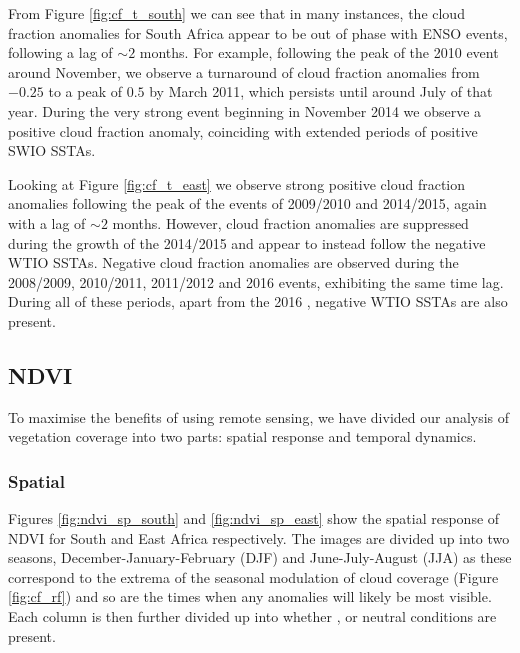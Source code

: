 From Figure \ref{fig:cf_t_south} we can see that in many instances, the
cloud fraction anomalies for South Africa appear to be out of phase
with ENSO events, following a lag of $\sim2$ months. For example,
following the peak of the 2010 \nina{} event around November, we
observe a turnaround of cloud fraction anomalies from $-0.25$ to a
peak of $0.5$ by March 2011, which persists until around July of that
year. During the very strong \elnino{} event beginning in November
2014 we observe a positive cloud fraction anomaly, coinciding with
extended periods of positive SWIO SSTAs.

Looking at Figure \ref{fig:cf_t_east} we observe strong positive cloud
fraction anomalies following the peak of the \elnino{} events of
2009/2010 and 2014/2015, again with a lag of $\sim2$ months. However,
cloud fraction anomalies are suppressed during the growth of the
2014/2015 \elnino{} and appear to instead follow the negative WTIO
SSTAs. Negative cloud fraction anomalies are observed during the
2008/2009, 2010/2011, 2011/2012 and 2016 \nina{} events, exhibiting
the same time lag. During all of these periods, apart from the 2016
\nina{}, negative WTIO SSTAs are also present.

\subsection{NDVI}
To maximise the benefits of using remote sensing, we have divided our
analysis of vegetation coverage into two parts: spatial response and
temporal dynamics.

\subsubsection{Spatial}
Figures \ref{fig:ndvi_sp_south} and \ref{fig:ndvi_sp_east} show the
spatial response of NDVI for South and East Africa respectively. The
images are divided up into two seasons, December-January-February
(DJF) and June-July-August (JJA) as these correspond to the extrema of
the seasonal modulation of cloud coverage (Figure \ref{fig:cf_rf}) and
so are the times when any anomalies will likely be most visible. Each
column is then further divided up into whether \elnino{}, \nina{} or
neutral conditions are present.

